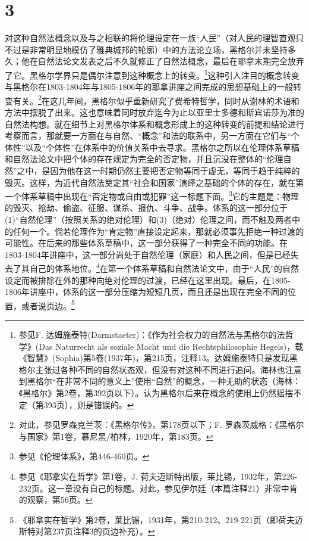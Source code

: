 \section*{3}

对这种自然法概念以及与之相联的将伦理设定在一族“人民”（对人民的理智直观只不过是非常明显地模仿了雅典城邦的轮廓）中的方法论立场，黑格尔并未坚持多久；他在自然法论文发表之后不久就修正了自然法概念，最后在耶拿末期完全放弃了它。黑格尔学界只是偶尔注意到这种概念上的转变。\footnote{参见F. 达姆施泰特(Darmstaeter)：《作为社会权力的自然法与黑格尔的法哲学》(Das Naturrecht als soziale Macht und die Rechtsphilosophie Hegels)，载《智慧》(Sophia)第5卷(1937年)，第215页，注释13。达姆施泰特只是发现黑格尔主张过各种不同的自然状态观，但没有对这种不同进行追问。海林也注意到黑格尔“在非常不同的意义上”使用“自然”的概念，一种无助的状态（海林：《黑格尔》第2卷，第392页以下）。认为黑格尔后来在概念的使用上仍然摇摆不定（第393页），则是错误的。}这种引人注目的概念转变与黑格尔在1803-1804年与1805-1806年的耶拿讲座之间完成的思想基础上的一般转变有关。\footnote{对此，参见罗森克兰茨：《黑格尔传》，第178页以下；F. 罗森茨威格：《黑格尔与国家》第1卷，慕尼黑/柏林，1920年，第183页。}在这几年间，黑格尔似乎重新研究了费希特哲学，同时从谢林的术语和方法中摆脱了出来。这也意味着同时放弃迄今为止以亚里士多德和斯宾诺莎为准的自然法构想。就在细节上对黑格尔体系和概念形成上的这种转变的前提和结论进行考察而言，那就要一方面在与自然、“概念”和法的联系中，另一方面在它们与“个体性”以及“个体性”在体系中的价值关系中去寻求。黑格尔之所以在伦理体系草稿和自然法论文中把个体的存在规定为完全的否定物，并且沉没在整体的“伦理自然”之中，是因为他在这一时期仍然主要把否定物等同于虚无，等同于趋于纯粹的毁灭。这样，为近代自然法奠定其“社会和国家”演绎之基础的个体的存在，就在第一个体系草稿中出现在“否定物或自由或犯罪”这一标题下面。\footnote{参见《伦理体系》，第446-460页。}它的主题是：物理的毁灭、抢劫、偷盗、征服、谋杀、报仇、斗争、战争。体系的这一部分位于(1)“自然伦理”（按照关系的绝对伦理）和(3)（绝对）伦理之间，而不触及两者中的任何一个。倘若伦理作为“肯定物”直接设定起来，那就必须事先拒绝一种过渡的可能性。在后来的那些体系草稿中，这一部分获得了一种完全不同的功能。在1803-1804年讲座中，这一部分尚处于自然伦理（家庭）和人民之间，但是已经失去了其自己的体系地位。\footnote{参见《耶拿实在哲学》第1卷，J. 荷夫迈斯特出版，莱比锡，1932年，第226-232页。这一章没有自己的标题。对此，参见伊尔廷（本篇注释21）非常中肯的观察，第56页。}在第一个体系草稿和自然法论文中，由于“人民”的自然设定而被排除在外的那种向绝对伦理的过渡，已经在这里出现。最后，在1805-1806年讲座中，体系的这一部分压缩为短短几页，而且还是出现在完全不同的位置，或者说页边。\footnote{《耶拿实在哲学》第2卷，莱比锡，1931年，第210-212、219-221页（即荷夫迈斯特对第237页注释3的页边补充）。}

